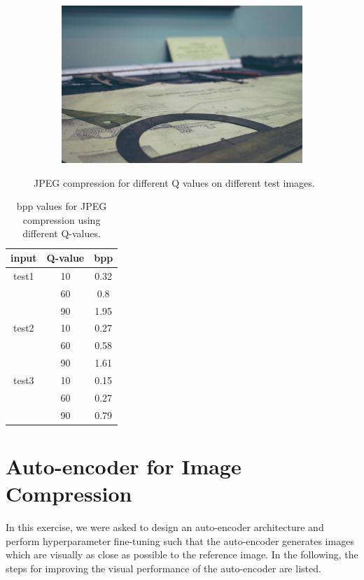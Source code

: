 \documentclass{article}
\begin{document}
\begin{figure}
\begin{subfigure}[b]{0.49 \textwidth}
    \end{subfigure}
    \begin{subfigure}[b]{0.49 \textwidth}
    \includegraphics[width=\textwidth]{Images/jpeg/reconstructed/test3_90.png}
    \end{subfigure}
    \caption{JPEG compression for different Q values on different test images.}
    \label{fig:jpeg}
\end{figure}

\begin{table}[]
    \centering
    \caption{bpp values for JPEG compression using different Q-values.}
    \begin{tabular}{c|c c}
        input & Q-value & bpp \\
        \hline 
        \hline
        \textsf{test1}& 10 & 0.32 \\
        & 60 & 0.8\\
        & 90 & 1.95 \\
        \hline
        \textsf{test2}& 10 & 0.27 \\
        & 60 & 0.58\\
        & 90 & 1.61\\
        \hline
        \textsf{test3}& 10 & 0.15 \\
        & 60 & 0.27 \\
        & 90 & 0.79\\
    \end{tabular}
    \label{tab:jpeg_bpp}
\end{table}

\section{Auto-encoder for Image Compression}
In this exercise, we were asked to design an auto-encoder architecture and perform hyperparameter fine-tuning such that the auto-encoder generates images which are visually as close as possible to the reference image. In the following, the steps for improving the visual performance of the auto-encoder are listed.\\
\end{document}
